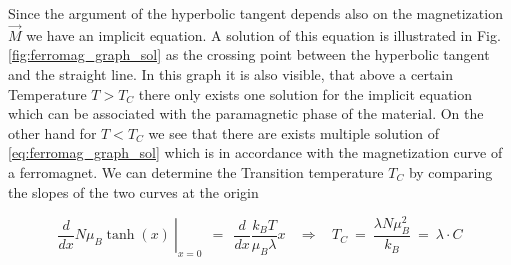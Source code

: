\documentclass[10pt]{report}
\numberwithin{equation}{chapter}
\newcommand{\myRef}[1]{
  Fig.\ref{#1}
}
\begin{document}
Since the argument of the hyperbolic tangent depends also on the magnetization $\vec{M}$ we have an implicit equation. A solution of this equation is illustrated in \myRef{fig:ferromag_graph_sol} as the crossing point between the hyperbolic tangent and the straight line. In this graph it is also visible, that above a certain Temperature $T>T_C$ there only exists one solution for the implicit equation which can be associated with the paramagnetic phase of the material. On the other hand for $T<T_C$ we see that there are exists multiple solution of \ref{eq:ferromag_graph_sol} which is in accordance with the magnetization curve of a ferromagnet. We can determine the Transition temperature $T_C$ by comparing the slopes of the two curves at the origin

\begin{equation}
  \left. \frac{d}{dx} N \mu_B \tanh(x)\ \right|_{x=0} ~~ = ~~ \frac{d}{dx} \frac{k_BT}{\mu_B \lambda} x ~~~~ \Rightarrow ~~~~
  T_C ~=~\frac{\lambda N \mu_B^2}{k_B} ~=~ \lambda \cdot C
\end{equation}
\end{document}
